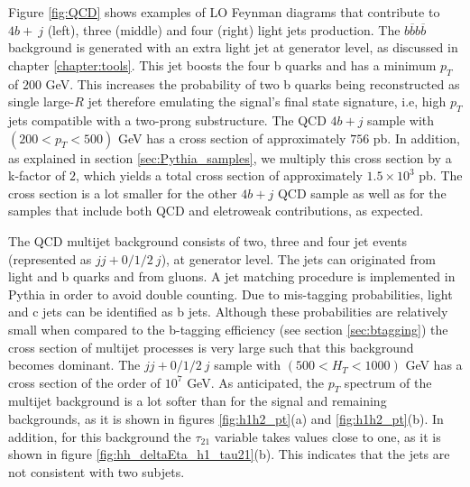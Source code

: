 Figure \ref{fig:QCD} shows examples of LO Feynman diagrams that contribute to $4b+~j$ (left), three (middle) and four (right) light jets production. The $b\overline{b}b\overline{b}$ background is generated with an extra light jet at generator level, as discussed in chapter \ref{chapter:tools}. This jet boosts the four b quarks and has a minimum $p_T$ of $200$ GeV. This increases the probability of two b quarks being reconstructed as single large-$R$ jet therefore emulating the signal's final state signature, i.e, high $p_T$ jets compatible with a two-prong substructure. The QCD $4b+j$ sample with $(200<p_T<500)$ GeV has a cross section of approximately $756$ pb. In addition, as explained in section \ref{sec:Pythia_samples}, we multiply this cross section by a k-factor of $2$, which yields a total cross section of approximately $1.5\times 10^{3}$ pb. The cross section is a lot smaller for the other $4b+j$ QCD sample as well as for the samples that include both QCD and eletroweak contributions, as expected.

The QCD multijet background consists of two, three and four jet events (represented as $jj+0/1/2 ~j$), at generator level. The jets can originated from light and b quarks and from gluons. A jet matching procedure is implemented in Pythia in order to avoid double counting. Due to mis-tagging probabilities, light and c jets can be identified as b jets. Although these probabilities are relatively small when compared to the b-tagging efficiency (see section \ref{sec:btagging}) the cross section of multijet processes is very large such that this background becomes dominant. The $jj+0/1/2 ~j$ sample with $(500<H_T<1000)$ GeV has a cross section of the order of $10^7$ GeV. As anticipated, the $p_T$ spectrum of the multijet background is a lot softer than for the signal and remaining backgrounds, as it is shown in figures \ref{fig:h1h2_pt}(a) and \ref{fig:h1h2_pt}(b). In addition, for this background the $\tau_{21}$ variable takes values close to one, as it is shown in figure \ref{fig:hh_deltaEta_h1_tau21}(b). This indicates that the jets are not consistent with two subjets. 

